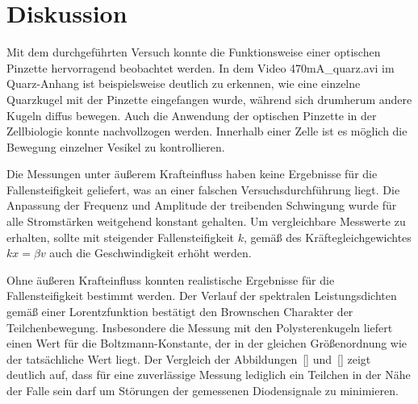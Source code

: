 \section{Diskussion}
\label{sec: diskussion}

Mit dem durchgeführten Versuch konnte die Funktionsweise einer optischen Pinzette
hervorragend beobachtet werden. In dem Video 470mA_quarz.avi im Quarz-Anhang ist beispielsweise
deutlich zu erkennen, wie eine einzelne Quarzkugel mit der Pinzette eingefangen wurde, während sich
drumherum andere Kugeln diffus bewegen. Auch die Anwendung der optischen Pinzette in der Zellbiologie
konnte nachvollzogen werden. Innerhalb einer Zelle ist es möglich die Bewegung einzelner Vesikel
zu kontrollieren.

Die Messungen unter äußerem Krafteinfluss haben keine Ergebnisse für die Fallensteifigkeit geliefert, was
an einer falschen Versuchsdurchführung liegt. Die Anpassung der Frequenz und Amplitude der treibenden
Schwingung wurde für alle Stromstärken weitgehend konstant gehalten. Um vergleichbare Messwerte zu erhalten,
sollte mit steigender Fallensteifigkeit $k$, gemäß des Kräftegleichgewichtes $kx = \beta v$ auch die
Geschwindigkeit erhöht werden.

Ohne äußeren Krafteinfluss konnten realistische Ergebnisse für die Fallensteifigkeit bestimmt werden. Der
Verlauf der spektralen Leistungsdichten gemäß einer Lorentzfunktion bestätigt den Brownschen Charakter der
Teilchenbewegung. Insbesondere die Messung mit den Polysterenkugeln liefert einen Wert für die Boltzmann-Konstante, der
in der gleichen Größenordnung wie der tatsächliche Wert liegt. Der Vergleich der Abbildungen~\ref{}
und~\ref{} zeigt deutlich auf, dass für eine zuverlässige Messung lediglich ein Teilchen in der Nähe der
Falle sein darf um Störungen der gemessenen Diodensignale zu minimieren. 
